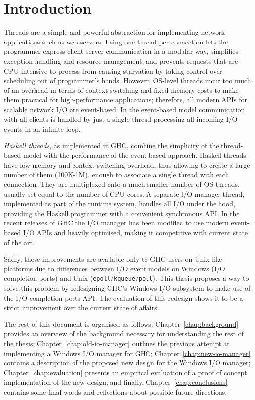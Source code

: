 \documentclass[a4paper,11pt,oneside]{report}
\begin{document}
\chapter{Introduction}

Threads are a simple and powerful abstraction for implementing network
applications such as web servers. Using one thread per connection lets the
programmer express client-server communication in a modular way, simplifies
exception handling and resource management, and prevents requests that are
CPU-intensive to process from causing starvation by taking control over
scheduling out of programmer's hands. However, OS-level threads incur too much
of an overhead in terms of context-switching and fixed memory costs to make them
practical for high-performance applications; therefore, all modern APIs for
scalable network I/O are event-based. In the event-based model communication
with all clients is handled by just a single thread processing all incoming I/O
events in an infinite loop.

\textit{Haskell threads}, as implemented in GHC, combine the simplicity of the
thread-based model with the performance of the event-based approach. Haskell
threads have low memory and context-switching overhead, thus allowing to create
a large number of them (100K-1M), enough to associate a single thread with each
connection. They are multiplexed onto a much smaller number of OS threads,
usually set equal to the number of CPU cores. A separate I/O manager thread,
implemented as part of the runtime system, handles all I/O under the hood,
providing the Haskell programmer with a convenient synchronous API. In the
recent releases of GHC the I/O manager has been modified to use modern
event-based I/O APIs and heavily optimised, making it competitive with current
state of the art.

Sadly, those improvements are available only to GHC users on Unix-like platforms
due to differences between I/O event models on Windows (I/O completion ports)
and Unix (\texttt{epoll}/\texttt{kqueue}/\texttt{poll}). This thesis proposes a
way to solve this problem by redesigning GHC's Windows I/O subsystem to make use
of the I/O completion ports API. The evaluation of this redesign shows it to be
a strict improvement over the current state of affairs.

The rest of this document is organised as follows: Chapter~\ref{chap:background}
provides an overview of the background necessary for understanding the rest of
the thesis; Chapter~\ref{chap:old-io-manager} outlines the previous attempt at
implementing a Windows I/O manager for GHC; Chapter~\ref{chap:new-io-manager}
contains a description of the proposed new design for the Windows I/O manager;
Chapter~\ref{chap:evaluation} presents an empirical evaluation of a proof of
concept implementation of the new design; and finally,
Chapter~\ref{chap:conclusions} contains some final words and reflections about
possible future directions.
\end{document}
